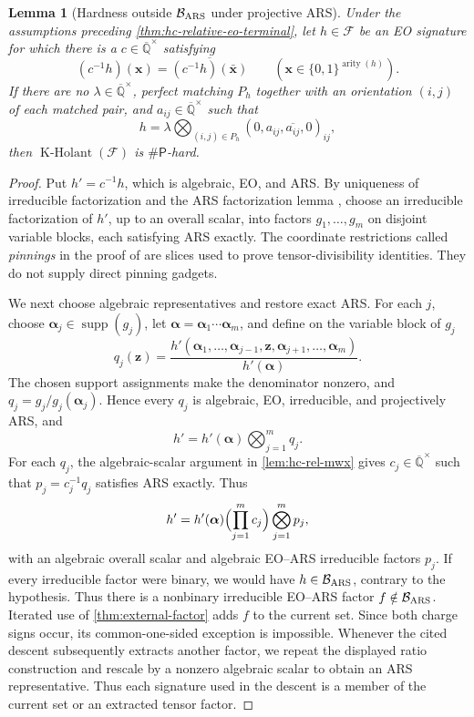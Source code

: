 \documentclass[11pt,letterpaper,onecolumn]{article}
\theoremstyle{plain}
\newtheorem{lemma}[lemma]{Lemma}
\theoremstyle{definition}
\theoremstyle{remark}
\newcommand{\AlgNums}{\overline{\mathbb Q}}
\newcommand{\cF}{\mathcal F}
\newcommand{\KHolant}{\operatorname{K\text{-}Holant}}
\newcommand{\SharpP}{\#\mathsf P}
\newcommand{\arity}{\operatorname{arity}}
\begin{document}
	\begin{lemma}[Hardness outside \(\mathcal B_{\rm ARS}\) under projective ARS]
		\label{lem:hc-rel-cfs}
		Under the assumptions preceding \cref{thm:hc-relative-eo-terminal}, let \(h\in\cF\) be an
		EO signature for which there is a
		\(c\in\AlgNums^\times\) satisfying
		\[
		(c^{-1}h)({\mathbf x})=\overline{(c^{-1}h)(\bar {\mathbf x})}
		\qquad({\mathbf x}\in\{0,1\}^{\arity(h)}).
		\]
		If there are no \(\lambda\in\AlgNums^\times\), perfect matching \(P_h\)
		together with an orientation \((i,j)\) of each matched pair, and
		\(a_{ij}\in\AlgNums^\times\) such that
		\[
		h=\lambda
		\bigotimes_{(i,j)\in P_h}(0,a_{ij},\overline{a_{ij}},0)_{ij},
		\]
		then \(\KHolant(\cF)\) is \(\SharpP\)-hard.
	\end{lemma}
	
	\begin{proof}
		Put \(h'=c^{-1}h\), which is algebraic, EO, and ARS.  By uniqueness of irreducible factorization
		and the ARS factorization lemma
		\cite[Lemmas~2.13--2.14]{CaiFuShao2020ARS}, choose an irreducible
		factorization of \(h'\), up to an overall scalar, into factors
		\(g_1,\ldots,g_m\) on disjoint variable blocks, each satisfying ARS exactly.
		The coordinate restrictions called \emph{pinnings} in the proof of
		\cite[Lemma~2.14]{CaiFuShao2020ARS} are slices used to prove
		tensor-divisibility identities.  They do not supply direct pinning gadgets.
		
		We next choose algebraic representatives and restore exact ARS.  For each \(j\), choose
		\({\boldsymbol{\alpha}}_j\in\operatorname{supp}(g_j)\), let
		\({\boldsymbol{\alpha}}={\boldsymbol{\alpha}}_1\cdots{\boldsymbol{\alpha}}_m\), and define on the variable block of \(g_j\)
		\[
		q_j({\mathbf z})=
		\frac{h'({\boldsymbol{\alpha}}_1,\ldots,{\boldsymbol{\alpha}}_{j-1},{\mathbf z},
			{\boldsymbol{\alpha}}_{j+1},\ldots,{\boldsymbol{\alpha}}_m)}{h'({\boldsymbol{\alpha}})}.
		\]
		The chosen support assignments make the denominator nonzero, and
		\(q_j=g_j/g_j({\boldsymbol{\alpha}}_j)\).  Hence every \(q_j\) is algebraic, EO, irreducible,
		and projectively ARS, and
		\[
		h'=h'({\boldsymbol{\alpha}})\bigotimes_{j=1}^m q_j.
		\]
		For each \(q_j\), the algebraic-scalar argument in
		\cref{lem:hc-rel-mwx} gives
		\(c_j\in\AlgNums^\times\) such that \(p_j=c_j^{-1}q_j\) satisfies ARS
		exactly.  Thus
		\[
		h'=h'({\boldsymbol{\alpha}})\Bigl(\prod_{j=1}^m c_j\Bigr)
		\bigotimes_{j=1}^m p_j,
		\]
		with an algebraic overall scalar and algebraic EO--ARS irreducible factors \(p_j\).
        If every irreducible factor were binary, we would have
        \(h\in\mathcal B_{\rm ARS}\), contrary to the hypothesis. Thus there is a nonbinary irreducible EO--ARS factor
		\(f\notin\mathcal B_{\rm ARS}\).  Iterated use of
		\cref{thm:external-factor} adds \(f\) to the current set. Since
		both charge signs occur, its common-one-sided exception is impossible.  Whenever
		the cited descent subsequently extracts another factor, we repeat the
		displayed ratio construction and rescale by a nonzero algebraic scalar to
		obtain an ARS representative. Thus each signature used in the descent
		is a member of the current set or an extracted tensor factor.
		

\end{proof}
\end{document}
